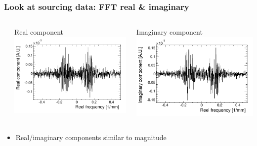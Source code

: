 \documentclass[bigger]{beamer}
\begin{document}
\begin{frame}
\frametitle{Look at sourcing data: FFT real \& imaginary}
\label{sec-3-1-7}
\begin{columns} %
\label{sec-3-1-7-1}
\begin{column}{0.55\textwidth}
\label{sec-3-1-7-1-1}

\centering
Real component
\includegraphics[width=\textwidth]{fig/FFT_real.png}
\end{column}
\begin{column}{0.55\textwidth}
\label{sec-3-1-7-1-2}

\centering
Imaginary component
\includegraphics[width=\textwidth]{fig/FFT_imag.png}
\end{column}
\end{columns}
\begin{itemize}

\item Real/imaginary components similar to magnitude
\label{sec-3-1-7-2}%
\end{itemize} %
\end{frame}
\end{document}

